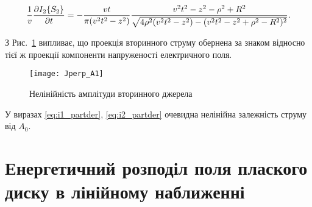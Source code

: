 %
\begin{equation} \begin{aligned} \label{eq:i2_partder}
\frac{1}{v} \frac{\partial  I_2 \{ S_2 \} }{\partial t} = 
- \frac{vt}{\pi (v^2t^2 - z^2) } \frac{ v^2t^2 - z^2 - \rho^2 + R^2 } 
{ \sqrt{ 4 \rho^2 (v^2t^2 - z^2) - (v^2t^2 - z^2 + \rho^2 - R^2)^2 } }.
\end{aligned} \end{equation}

З Рис.~\ref{fig:jx_secondary} випливає, що проекція вторинного струму обернена 
за знаком відносно тієї ж проекції компоненти напруженості електричного поля.

\begin{figure}[h] \begin{center}
\texttt{[image: Jperp\_A1]}
\caption{Нелінійність амплітуди вторинного джерела}
\label{fig:jx_secondary}
\end{center} \end{figure}

У виразах \eqref{eq:i1_partder}, \eqref{eq:i2_partder} очевидна нелінійна 
залежність струму від $ A_0 $.

\section{Енергетичний розподіл поля плаского диску в лінійному наближенні}

